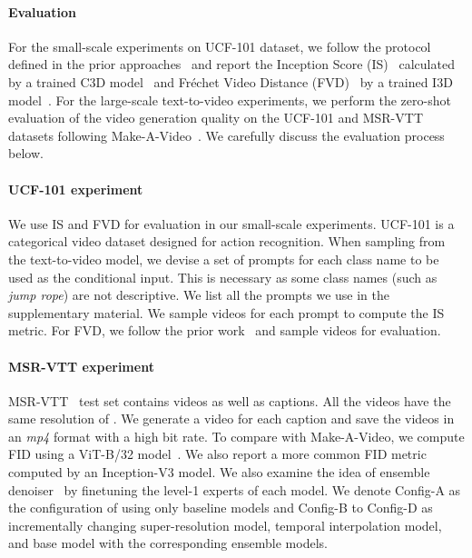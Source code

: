\documentclass[10pt,twocolumn,letterpaper]{article}
\begin{document}
\paragraph{Evaluation} For the small-scale experiments on UCF-101 dataset, we follow the protocol defined in the prior approaches~\cite{tian2021a,skorokhodov2021stylegan,ho2022video} and report the Inception Score (IS)~\cite{saito2020train} calculated by a trained C3D model~\cite{tran2015learning} and Fréchet Video Distance (FVD)~\cite{unterthiner2018towards} by a trained I3D model~\cite{carreira2017quo}. For the large-scale text-to-video experiments, we perform the zero-shot evaluation of the video generation quality on the UCF-101 and MSR-VTT datasets following Make-A-Video~\cite{singer2022make}. We carefully discuss the evaluation process below.


\paragraph{UCF-101 experiment} We use IS and FVD for evaluation in our small-scale experiments. UCF-101 is a categorical video dataset designed for action recognition. When sampling from the text-to-video model, we devise a set of prompts for each class name to be used as the conditional input. This is necessary as some class names (such as \textit{jump rope}) are not descriptive. We list all the prompts we use in the supplementary material. We sample  videos for each prompt to compute the IS metric. For FVD, we follow the prior work~\cite{le2021ccvs,tian2021a} and sample  videos for evaluation.


\paragraph{MSR-VTT experiment} MSR-VTT~\cite{xu2016msr} test set contains  videos as well as  captions. All the videos have the same resolution of . We generate a  video for each  caption and save the videos in an \textit{mp4} format with a high bit rate. To compare with Make-A-Video, we compute FID using a ViT-B/32 model~\cite{kynkaanniemi2023the}. We also report a more common FID metric computed by an Inception-V3 model. We also examine the idea of ensemble denoiser~\cite{balaji2022ediffi} by finetuning the level-1 experts of each model. We denote Config-A as the configuration of using only baseline models and Config-B to Config-D as incrementally changing super-resolution model, temporal interpolation model, and base model with the corresponding ensemble models.  
\end{document}
